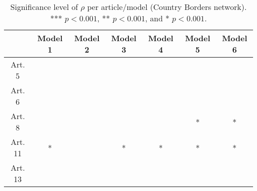 \begin{table}[ht]
\centering
\begin{tabular}{ccccccc}
  \toprule
 & Model 1 & Model 2 & Model 3 & Model 4 & Model 5 & Model 6 \\ 
  \midrule
Art. 5 &   &   &   &   &   &   \\ 
   \midrule
Art. 6 &   &   &   &   &   &   \\ 
   \midrule
Art. 8 &   &   &   &   & * & * \\ 
   \midrule
Art. 11 & * &   & * & * & * & * \\ 
   \midrule
Art. 13 &   &   &   &   &   &   \\ 
   \bottomrule
\end{tabular}
\caption{Significance level of $\rho$ per article/model (Country Borders network). *** $p < 0.001$, ** $p < 0.001$, and * $p < 0.001$.} 
\end{table}

